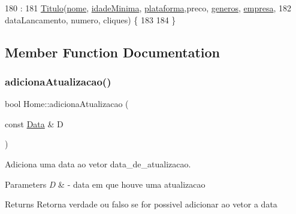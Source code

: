 \begin{DoxyCode}
180                                                                             :
181         \hyperlink{classTitulo_a898faeefdad15c64ae4cdc904a7e6f0e}{Titulo}(\hyperlink{classTitulo_a8abdf1fc6d4fc14be20bbec247664d83}{nome}, \hyperlink{classTitulo_a28891078f53fc3317de60ae739514955}{idadeMinima}, \hyperlink{classTitulo_a67761eb7f006453ab0869e4b7c0a9c0b}{plataforma},preco, 
      \hyperlink{classTitulo_a3209265c8534416978ee9891b96c14b2}{generos}, \hyperlink{classTitulo_a91510c440dc8583d60d88ea02f4eb1b6}{empresa},
182                 dataLancamento, numero, cliques) \{
183 
184  \}
\end{DoxyCode}


\subsection{Member Function Documentation}
\mbox{\label{classHome_a94aec68b520d98ac38c6794b5771cd53}} 
\subsubsection{\texorpdfstring{adiciona\+Atualizacao()}{adicionaAtualizacao()}}
{\footnotesize\ttfamily bool Home\+::adiciona\+Atualizacao (\begin{DoxyParamCaption}\item[{const \hyperlink{classData}{Data} \&}]{D }\end{DoxyParamCaption})}



Adiciona uma data ao vetor data\+\_\+de\+\_\+atualizacao. 


\begin{DoxyParams}{Parameters}
{\em D} & -\/ data em que houve uma atualizacao \\
\hline
\end{DoxyParams}
\begin{DoxyReturn}{Returns}
Retorna verdade ou falso se for possivel adicionar ao vetor a data 
\end{DoxyReturn}

